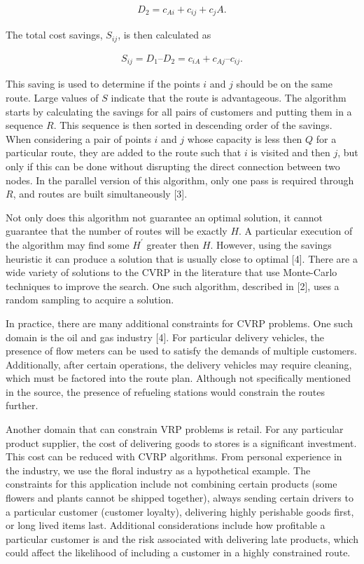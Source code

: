 \documentclass[12pt]{article}
\begin{document}
\begin{align*}
D_2 = c_{Ai} + c_{ij} + c_jA.
\end{align*}

\noindent The total cost savings, $S_{ij}$, is then calculated as

\begin{align*}
S_{ij} = D_1 – D_2 = c_{iA} + c_{Aj} – c_{ij}.
\end{align*}

This saving is used to determine if the points $i$ and $j$ should be on the same route. Large values of $S$ indicate that the route is advantageous. The algorithm starts by calculating the savings for all pairs of customers and putting them in a sequence $R$. This sequence is then sorted in descending order of the savings. When considering a pair of points $i$ and $j$ whose capacity is less then $Q$ for a particular route, they are added to the route such that $i$ is visited and then $j$, but only if this can be done without disrupting the direct connection between two nodes. In the parallel version of this algorithm, only one pass is required through $R$, and routes are built simultaneously [3].

Not only does this algorithm not guarantee an optimal solution, it cannot guarantee that the number of routes will be exactly $H$. A particular execution of the algorithm may find some $H^\prime$ greater then $H$. However, using the savings heuristic it can produce a solution that is usually close to optimal [4]. There are a wide variety of solutions to the CVRP in the literature that use Monte-Carlo techniques to improve the search. One such algorithm, described in [2], uses a random sampling to acquire a solution.

In practice, there are many additional constraints for CVRP problems. One such domain is the oil and gas industry [4]. For particular delivery vehicles, the presence of flow meters can be used to satisfy the demands of multiple customers. Additionally, after certain operations, the delivery vehicles may require cleaning, which must be factored into the route plan. Although not specifically mentioned in the source, the presence of refueling stations would constrain the routes further.

Another domain that can constrain VRP problems is retail. For any particular product supplier, the cost of delivering goods to stores is a significant investment. This cost can be reduced with CVRP algorithms. From personal experience in the industry, we use the floral industry as a hypothetical example. The constraints for this application include not combining certain products (some flowers and plants cannot be shipped together), always sending certain drivers to a particular customer (customer loyalty), delivering highly perishable goods first, or long lived items last. Additional considerations include how profitable a particular customer is and the risk associated with delivering late products, which could affect the likelihood of including a customer in a highly constrained route.
\end{document}
